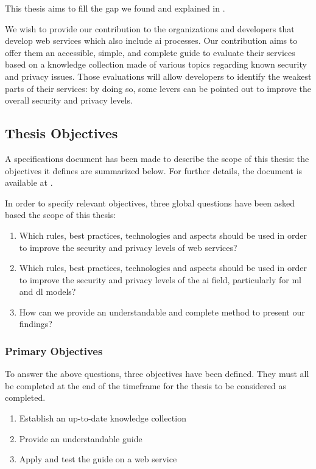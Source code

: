 This thesis aims to fill the gap we found and explained in .

We wish to provide our contribution to the organizations and developers that develop web services which also include \gls{ai} processes. Our contribution aims to offer them an accessible, simple, and complete guide to evaluate their services based on a knowledge collection made of various topics regarding known security and privacy issues. Those evaluations will allow developers to identify the weakest parts of their services: by doing so, some levers can be pointed out to improve the overall security and privacy levels.

\subsection{Thesis Objectives}
\label{subsec:introduction_objectives}

A specifications document has been made to describe the scope of this thesis: the objectives it defines are summarized below. For further details, the document is available at .

In order to specify relevant objectives, three global questions have been asked based the scope of this thesis:
\begin{enumerate}
    \item Which rules, best practices, technologies and aspects should be used in order to improve the security and privacy levels of web services?
    \item Which rules, best practices, technologies and aspects should be used in order to improve the security and privacy levels of the \gls{ai} field, particularly for \gls{ml} and \gls{dl} models?
    \item How can we provide an understandable and complete method to present our findings?
\end{enumerate}

\subsubsection{Primary Objectives}
\label{subsubsec:introduction_objectives_primary}

To answer the above questions, three objectives have been defined. They must all be completed at the end of the timeframe for the thesis to be considered as completed.
\begin{enumerate}
    \item Establish an up-to-date knowledge collection
    \item Provide an understandable guide
    \item Apply and test the guide on a web service
\end{enumerate}

